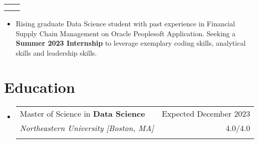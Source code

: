 \documentclass[letterpaper,11pt]{article}
\makeatletter
\newcommand{\sectionStart}{
  \begin{itemize}[label={},leftmargin=0in]
}
\newcommand{\sectionEnd}{
  \end{itemize}
}
\newcommand{\head}[9]{
  \noindent
  \begin{tabular*}{\textwidth}{l@{\extracolsep{\fill}}r}
    \centerline{
      \textbf{\href{#1}{\color{black}{\LARGE {\underline{#2}}}}}
    }
    \vspace{5pt}\\
    \centerline{
      \href{mailto:#3}{\underline{#3}} $\mid$
      #4 $\mid$
      #5 : \href{#6}{\underline{#7}} $\mid$
      #8 : \href{#9}{\underline{#7}}
    }
  \end{tabular*}
  \vspace{-10pt}
}
\newcommand{\summaryText}[1]{
  \item
  \begin{addmargin}[7pt]{0pt}
    {#1}
  \end{addmargin}
}
\newcommand{\educationItem}[5]{
  \vspace{-1pt}
  \item
  \begin{tabular*}{\textwidth}{l@{\extracolsep{\fill}}r@{}}
    {#1 in \textbf{#2}}  & {#3}\\
    {\textit{#4}} & {#5}\\\vspace{-18pt}
  \end{tabular*}
  \vspace{-5pt}
}
\makeatother
\begin{document}
\head
  {Shweta Mishra}
  {mishra.shw@northeastern.edu}
  {+1 (857) 260-9071}
  {Github}
  {https://github.com/MishraCo}
  {LinkedIn}
  {www.linkedin.com/in/shweta-mishra-ds}

\section{Summary}
\sectionStart
  \summaryText
  {Rising graduate Data Science student with past experience in Financial Supply Chain Management on Oracle Peoplesoft Application. Seeking a \textbf{Summer 2023 Internship} to leverage exemplary coding skills, analytical skills and leadership skills.}
\sectionEnd

\section{Education}
\sectionStart
  \educationItem
    {Master of Science} 
    {Data Science} 
    {Expected December 2023}
    {Northeastern University [Boston, MA]} 
    {4.0/4.0}
\sectionEnd

\end{document}
